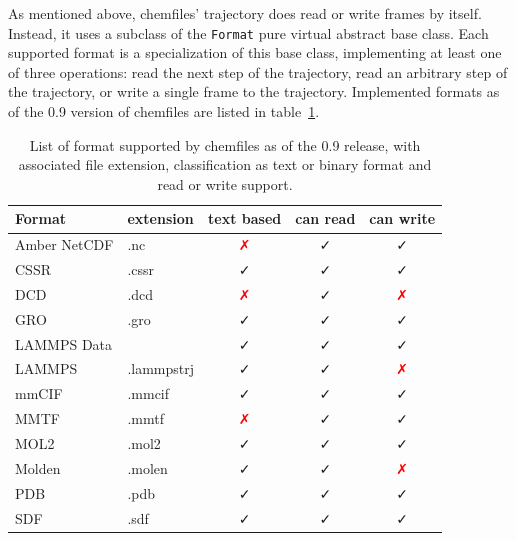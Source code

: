 \documentclass[thesis]{subfiles}
\begin{document}
As mentioned above, chemfiles' trajectory does read or write frames by itself.
Instead, it uses a subclass of the \texttt{Format} pure virtual abstract base
class. Each supported format is a specialization of this base class,
implementing at least one of three operations: read the next step of the
trajectory, read an arbitrary step of the trajectory, or write a single frame to
the trajectory. Implemented formats as of the 0.9 version of chemfiles are
listed in table~\ref{tab:chemfiles:formats}.

\begin{table}[ht]
    \centering
    \caption{List of format supported by chemfiles as of the 0.9 release, with
    associated file extension, classification as text or binary format and
    read or write support.}
    \label{tab:chemfiles:formats}
    \def\nope{\textcolor{red}{✗}}
    \def\yep{\textcolor{webgreen}{✓}}
    \begin{tabular}{l l c c c}
        \toprule
        Format                         & extension & text based & can read & can write \\
        \midrule
        Amber NetCDF\cite{AmberNetCDF} & .nc       & \nope      &  \yep    & \yep   \\
        CSSR                           & .cssr     & \yep       &  \yep    & \yep   \\
        DCD                            & .dcd      & \nope      &  \yep    & \nope  \\
        GRO                            & .gro      & \yep       &  \yep    & \yep   \\
        LAMMPS Data                    &           & \yep       &  \yep    & \yep   \\
        LAMMPS                         &.lammpstrj & \yep       &  \yep    & \nope  \\
        mmCIF\cite{Bourne1997}         & .mmcif    & \yep       &  \yep    & \yep   \\
        MMTF\cite{Bradley2017}         & .mmtf     & \nope      &  \yep    & \yep   \\
        MOL2                           & .mol2     & \yep       &  \yep    & \yep   \\
        Molden                         & .molen    & \yep       &  \yep    & \nope  \\
        PDB\cite{Berman2003}           & .pdb      & \yep       &  \yep    & \yep   \\
        SDF                            & .sdf      & \yep       &  \yep    & \yep   \\

\end{tabular}
\end{table}
\end{document}
